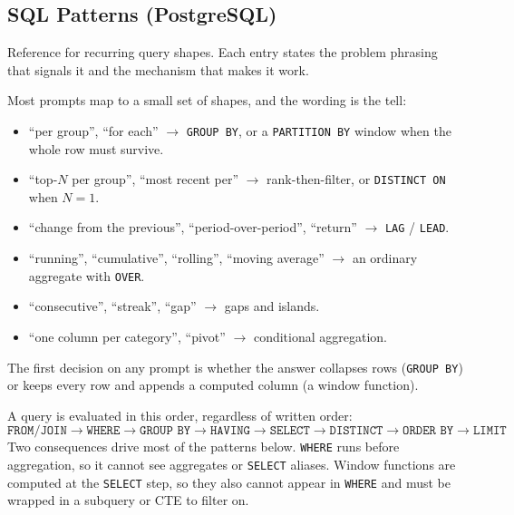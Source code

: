\subsection{SQL Patterns (PostgreSQL)}

Reference for recurring query shapes. Each entry states the problem phrasing
that signals it and the mechanism that makes it work.

\begin{keybox}
Most prompts map to a small set of shapes, and the wording is the tell:
\begin{itemize}[label=$\circ$, itemsep=1ex]
  \item ``per group'', ``for each'' $\to$ \texttt{GROUP BY}, or a
  \texttt{PARTITION BY} window when the whole row must survive.
  \item ``top-$N$ per group'', ``most recent per'' $\to$ rank-then-filter,
  or \texttt{DISTINCT ON} when $N = 1$.
  \item ``change from the previous'', ``period-over-period'', ``return''
  $\to$ \texttt{LAG} / \texttt{LEAD}.
  \item ``running'', ``cumulative'', ``rolling'', ``moving average'' $\to$
  an ordinary aggregate with \texttt{OVER}.
  \item ``consecutive'', ``streak'', ``gap'' $\to$ gaps and islands.
  \item ``one column per category'', ``pivot'' $\to$ conditional aggregation.
\end{itemize}

\vspace{1ex}
The first decision on any prompt is whether the answer collapses rows
(\texttt{GROUP BY}) or keeps every row and appends a computed column (a
window function).
\end{keybox}

\begin{keybox}
A query is evaluated in this order, regardless of written order:
\[
  \texttt{FROM/JOIN} \to \texttt{WHERE} \to \texttt{GROUP BY} \to
  \texttt{HAVING} \to \texttt{SELECT} \to \texttt{DISTINCT} \to
  \texttt{ORDER BY} \to \texttt{LIMIT}
\]
Two consequences drive most of the patterns below. \texttt{WHERE} runs
before aggregation, so it cannot see aggregates or \texttt{SELECT} aliases.
Window functions are computed at the \texttt{SELECT} step, so they also
cannot appear in \texttt{WHERE} and must be wrapped in a subquery or CTE
to filter on.
\end{keybox}


